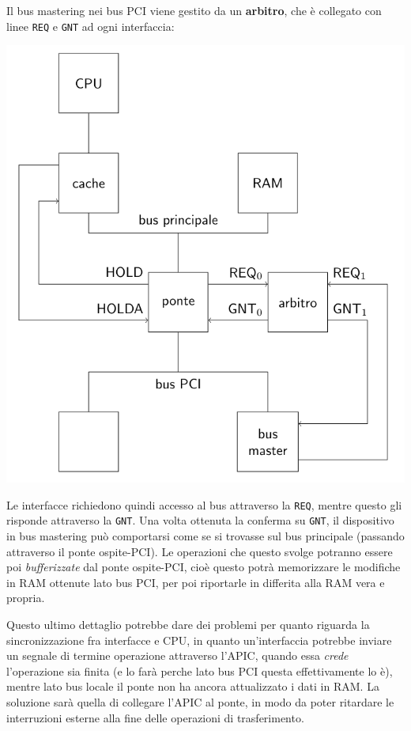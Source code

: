 \documentclass[a4paper,11pt]{article}
\begin{document}
\noindent
\begin{minipage}{\textwidth}

	Il bus mastering nei bus PCI viene gestito da un \textbf{arbitro}, che è collegato con linee \lstinline|REQ| e \lstinline|GNT| ad ogni interfaccia:

	\begin{center}
		\includegraphics[scale=0.55]{../figures/dma_pci.png}
	\end{center}

\end{minipage}

Le interfacce richiedono quindi accesso al bus attraverso la \lstinline|REQ|, mentre questo gli risponde attraverso la \lstinline|GNT|.
Una volta ottenuta la conferma su \lstinline|GNT|, il dispositivo in bus mastering può comportarsi come se si trovasse sul bus principale (passando attraverso il ponte ospite-PCI).
Le operazioni che questo svolge potranno essere poi \textit{bufferizzate} dal ponte ospite-PCI, cioè questo potrà memorizzare le modifiche in RAM ottenute lato bus PCI, per poi riportarle in differita alla RAM vera e propria.

Questo ultimo dettaglio potrebbe dare dei problemi per quanto riguarda la sincronizzazione fra interfacce e CPU, in quanto un'interfaccia potrebbe inviare un segnale di termine operazione attraverso l'APIC, quando essa \textit{crede} l'operazione sia finita (e lo farà perche lato bus PCI questa effettivamente lo è), mentre lato bus locale il ponte non ha ancora attualizzato i dati in RAM.
La soluzione  sarà quella di collegare l'APIC al ponte, in modo da poter ritardare le interruzioni esterne alla fine delle operazioni di trasferimento.
\end{document}
